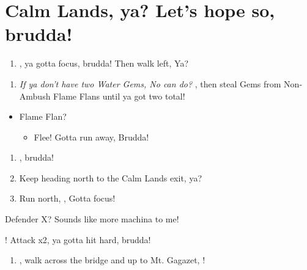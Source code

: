 \chapter{Calm Lands, ya? Let's hope so, brudda!}

\begin{enumerate}
\item \sd, ya gotta focus, brudda! Then walk left, Ya?
\end{enumerate}
\begin{spheregrid}
\begin{itemize}
\yunaf
{}
\end{itemize}
\end{spheregrid}
\begin{enumerate}[resume]
\item \textit{If ya don't have two Water Gems, No can do?} \formation{\tidus}{\yuna}{\kimahri}, then steal Gems from Non-Ambush Flame Flans until ya got two total!
\end{enumerate}
\begin{encounters}
\begin{itemize}
\item Flame Flan?
\begin{itemize}
\rikkuf Steal! That Al Bhed knows how to steal good, Ya?
\item Flee! Gotta run away, Brudda!
\end{itemize}
\end{itemize}
\end{encounters}
\begin{enumerate}[resume]
\item \formation{\tidus}{\rikku}{\kimahri}, brudda!
\item Keep heading north to the Calm Lands exit, ya?
\item Run north, \sd, Gotta focus!
\end{enumerate}
\begin{battle}[64000]{Defender X? Sounds like more machina to me!}
\begin{itemize}
\switch{\tidus}{\yuna}
\summon{\bahamut}!
\bahamutf Attack x2, ya gotta hit hard, brudda!
\end{itemize}
\end{battle}
\begin{enumerate}[resume]
\item \sd, walk across the bridge and up to Mt. Gagazet, \sd!
\end{enumerate}